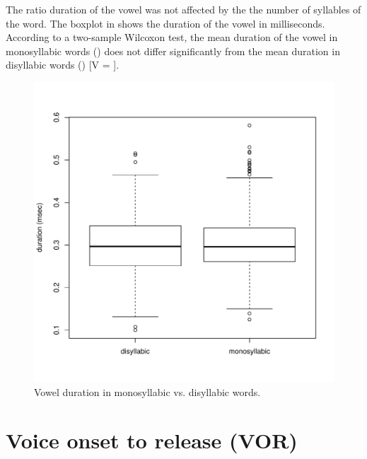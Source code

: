 \documentclass[11pt,a4paper,openany]{memoir}\usepackage[]{graphicx}\usepackage[]{color}
\newenvironment{knitrout}{}{} %
\begin{document}
The ratio duration of the vowel was not affected by the the number of syllables of the word.
The boxplot in  shows the duration of the vowel in milliseconds.
According to a two-sample Wilcoxon test, the mean duration of the vowel in monosyllabic words () does not differ significantly from the mean duration in disyllabic words () [V = ].

\begin{figure}
\centering
\begin{knitrout}
\color{fgcolor}
\includegraphics[width=\textwidth]{img/voic-syll-box-1} 

\end{knitrout}
\caption{Vowel duration in monosyllabic vs. disyllabic words.}
\label{f:vvpsyll}
\end{figure}

\section{Voice onset to release (VOR)}
\end{document}

